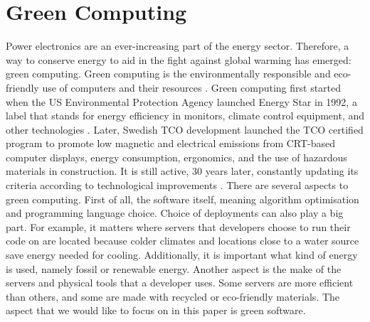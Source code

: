 \chapter{Green Computing}
\setcounter{page}{1}

Power electronics are an ever-increasing part of the energy sector. Therefore, a way to conserve energy to aid in the fight against global warming has emerged: green computing.
Green computing is the environmentally responsible and eco-friendly use of computers and their resources \cite{Salama20}. Green computing first started when the US Environmental Protection Agency launched Energy Star in 1992, a label that stands for energy efficiency in monitors, climate control equipment, and other technologies \cite{ENERGYSTAR}.
Later, Swedish TCO development launched the TCO certified program to promote low magnetic and electrical emissions from CRT-based computer displays, energy consumption, ergonomics, and the use of hazardous materials in construction. It is still active, 30 years later, constantly updating its criteria according to technological improvements \cite{TCOCertified}.
There are several aspects to green computing. First of all, the software itself, meaning algorithm optimisation and programming language choice. Choice of deployments can also play a big part. For example, it matters where servers that developers choose to run their code on are located because colder climates and locations close to a water source save energy needed for cooling. Additionally, it is important what kind of energy is used, namely fossil or renewable energy. Another aspect is the make of the servers and physical tools that a developer uses. Some servers are more efficient than others, and some are made with recycled or eco-friendly materials.
The aspect that we would like to focus on in this paper is green software.

